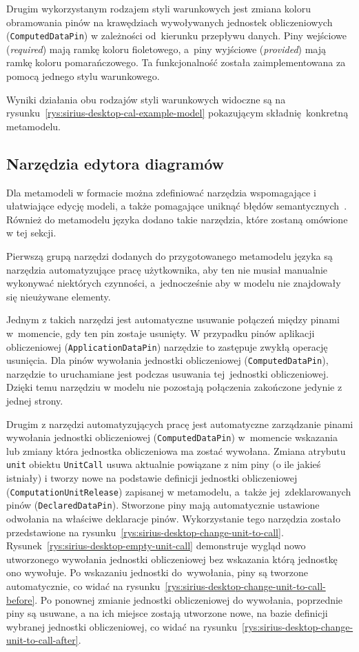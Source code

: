 Drugim wykorzystanym rodzajem styli warunkowych jest zmiana koloru obramowania
pinów na krawędziach wywoływanych jednostek obliczeniowych
(\texttt{ComputedDataPin}) w
zależności od~kierunku przepływu danych. Piny wejściowe (\emph{required}) mają
ramkę koloru fioletowego, a~piny wyjściowe (\emph{provided}) mają ramkę koloru
pomarańczowego. Ta funkcjonalność została zaimplementowana za pomocą jednego
stylu warunkowego.

Wyniki działania obu rodzajów styli warunkowych widoczne są na
rysunku~\ref{rys:sirius-desktop-cal-example-model} pokazującym
składnię konkretną metamodelu.

\subsection{Narzędzia edytora diagramów}\label{sec:cal-metamodel-tools}

Dla metamodeli w formacie \Ecore{} można zdefiniować narzędzia wspomagające i
ułatwiające edycję modeli, a także pomagające uniknąć
błędów semantycznych~\cite{sirius-desktop-documentation-tools}. Również do
metamodelu języka
\CAL{} dodano takie narzędzia, które zostaną omówione w tej sekcji.

Pierwszą grupą narzędzi dodanych do przygotowanego metamodelu języka \CAL{} są
narzędzia
automatyzujące pracę użytkownika, aby ten nie musiał manualnie wykonywać
niektórych czynności, a~jednocześnie aby w modelu nie znajdowały się nieużywane
elementy.

Jednym z takich narzędzi jest automatyczne usuwanie połączeń między pinami
w~momencie, gdy ten pin zostaje usunięty. W przypadku pinów aplikacji
obliczeniowej (\texttt{Application\-Data\-Pin}) narzędzie to zastępuje zwykłą
operację usunięcia. Dla pinów wywołania jednostki obliczeniowej
(\texttt{ComputedDataPin}), narzędzie to uruchamiane jest podczas usuwania
tej~jednostki obliczeniowej. Dzięki temu narzędziu w modelu nie pozostają
połączenia
zakończone jedynie z jednej strony.

Drugim z narzędzi automatyzujących pracę jest automatyczne zarządzanie
pinami wywołania jednostki obliczeniowej (\texttt{ComputedDataPin}) w~momencie
wskazania lub zmiany która jednostka obliczeniowa ma zostać wywołana. Zmiana
atrybutu \texttt{unit} obiektu \texttt{UnitCall} usuwa aktualnie powiązane z
nim piny (o ile jakieś istniały) i tworzy nowe na podstawie definicji jednostki
obliczeniowej (\texttt{ComputationUnitRelease}) zapisanej w metamodelu,
a~także jej~zdeklarowanych pinów (\texttt{DeclaredDataPin}). Stworzone piny
mają
automatycznie ustawione odwołania na właściwe deklaracje pinów.
Wykorzystanie tego narzędzia zostało przedstawione na
rysunku~\ref{rys:sirius-desktop-change-unit-to-call}.
Rysunek~\ref{rys:sirius-desktop-empty-unit-call} demonstruje wygląd nowo
utworzonego wywołania jednostki obliczeniowej bez wskazania którą jednostkę ono
wywołuje. Po wskazaniu jednostki do~wywołania, piny są tworzone automatycznie,
co
widać na rysunku~\ref{rys:sirius-desktop-change-unit-to-call-before}. Po
ponownej zmianie jednostki obliczeniowej do wywołania, poprzednie piny są
usuwane, a na ich miejsce zostają utworzone nowe, na bazie definicji wybranej
jednostki obliczeniowej, co widać na
rysunku~\ref{rys:sirius-desktop-change-unit-to-call-after}.

